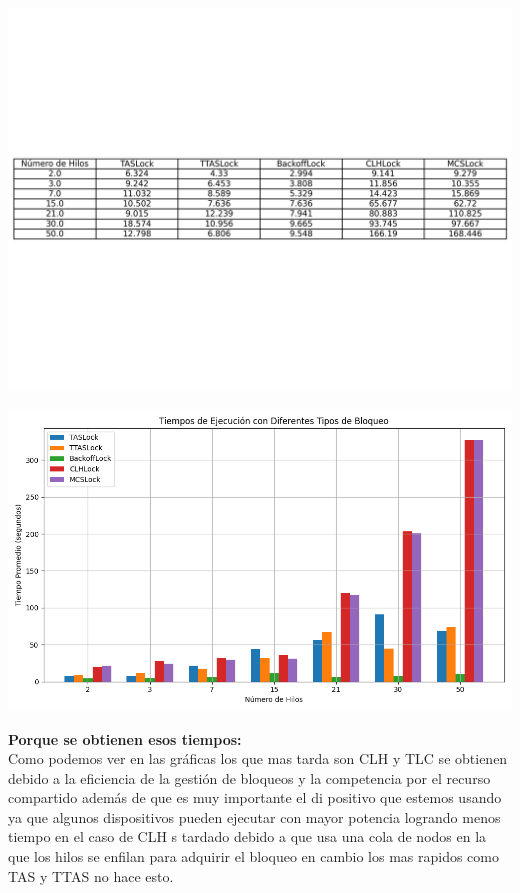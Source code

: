\documentclass[12pt]{article}
\begin{document}
\begin{itemize}
\begin{center}
         \includegraphics[width=1.0\linewidth]{Practica3/ImaP3/t3.png}
     \end{center}
        \begin{center}
         \includegraphics[width=1.0\linewidth]{Practica3/ImaP3/g2.png}
     \end{center}
 \end{itemize}

 \textbf{Porque se obtienen esos tiempos:}\\

 
Como podemos ver en las gráficas los que mas tarda son CLH y TLC se obtienen debido a la eficiencia de la gestión de bloqueos y la competencia por el recurso compartido además de que es muy importante el di positivo que estemos usando ya que algunos dispositivos pueden ejecutar con mayor potencia logrando menos tiempo en el caso de CLH s tardado debido a que usa una cola de nodos en la que los hilos se enfilan para adquirir el bloqueo en cambio los mas rapidos como TAS y TTAS no hace esto.
\end{document}
